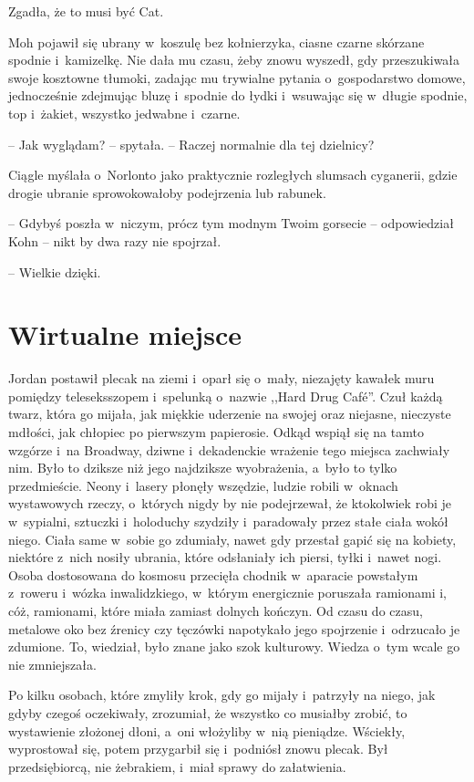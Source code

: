 \documentclass[oneside,polish,11pt,sfheadings]{mwbk}
\begin{document}
Zgadła, że to musi być Cat.

Moh pojawił się ubrany w~koszulę bez kołnierzyka, ciasne czarne skórzane
spodnie i~kamizelkę. Nie dała mu czasu, żeby znowu wyszedł, gdy
przeszukiwała swoje kosztowne tłumoki, zadając mu trywialne pytania o~gospodarstwo domowe, jednocześnie zdejmując bluzę i~spodnie do łydki i~wsuwając się w~długie spodnie, top i~żakiet, wszystko jedwabne i~czarne.

-- Jak wyglądam? -- spytała. -- Raczej normalnie dla tej dzielnicy?

Ciągle myślała o~Norlonto jako praktycznie rozległych slumsach
cyganerii, gdzie drogie ubranie sprowokowałoby podejrzenia lub rabunek.

-- Gdybyś poszła w~niczym, prócz tym modnym Twoim gorsecie -- odpowiedział
Kohn -- nikt by dwa razy nie spojrzał.

-- Wielkie dzięki.

\chapter{Wirtualne miejsce}

Jordan postawił plecak na ziemi i~oparł się o~mały, niezajęty kawałek
muru pomiędzy teleseksszopem i~spelunką o~nazwie ,,Hard Drug Café''. Czuł
każdą twarz, która go mijała, jak miękkie uderzenie na swojej oraz
niejasne, nieczyste mdłości, jak chłopiec po pierwszym papierosie. Odkąd
wspiął się na tamto wzgórze i~na Broadway, dziwne i~dekadenckie wrażenie
tego miejsca zachwiały nim. Było to dziksze niż jego najdziksze
wyobrażenia, a~było to tylko przedmieście. Neony i~lasery płonęły
wszędzie, ludzie robili w~oknach wystawowych rzeczy, o~których nigdy by
nie podejrzewał, że ktokolwiek robi je w~sypialni, sztuczki i~holoduchy
szydziły i~paradowały przez stałe ciała wokół niego. Ciała same w~sobie
go zdumiały, nawet gdy przestał gapić się na kobiety, niektóre z~nich
nosiły ubrania, które odsłaniały ich piersi, tyłki i~nawet nogi. Osoba
dostosowana do kosmosu przecięła chodnik w~aparacie powstałym z~roweru i~wózka inwalidzkiego, w~którym energicznie poruszała ramionami i, cóż,
ramionami, które miała zamiast dolnych kończyn. Od czasu do czasu,
metalowe oko bez źrenicy czy tęczówki napotykało jego spojrzenie i~odrzucało je zdumione. To, wiedział, było znane jako szok kulturowy.
Wiedza o~tym wcale go nie zmniejszała.

Po kilku osobach, które zmyliły krok, gdy go mijały i~patrzyły na niego,
jak gdyby czegoś oczekiwały, zrozumiał, że wszyst\-ko co musiałby zrobić,
to wystawienie złożonej dłoni, a~oni włożyliby w~nią pieniądze.
Wściekły, wyprostował się, potem przygarbił się i~podniósł znowu plecak.
Był przedsiębiorcą, nie żebrakiem, i~miał sprawy do załatwienia.
\end{document}
